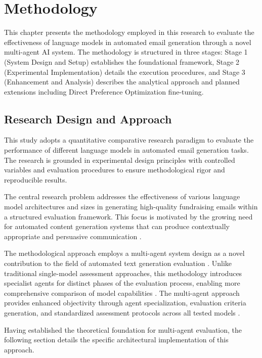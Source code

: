 \chapter{Methodology}

This chapter presents the methodology employed in this research to evaluate the effectiveness of language models in automated email generation through a novel multi-agent AI system. The methodology is structured in three stages: Stage 1 (System Design and Setup) establishes the foundational framework, Stage 2 (Experimental Implementation) details the execution procedures, and Stage 3 (Enhancement and Analysis) describes the analytical approach and planned extensions including Direct Preference Optimization fine-tuning.

\section{Research Design and Approach}
\label{sec:research-design}

This study adopts a quantitative comparative research paradigm to evaluate the performance of different language models in automated email generation tasks. The research is grounded in experimental design principles with controlled variables and evaluation procedures to ensure methodological rigor and reproducible results.

The central research problem addresses the effectiveness of various language model architectures and sizes in generating high-quality fundraising emails within a structured evaluation framework. This focus is motivated by the growing need for automated content generation systems that can produce contextually appropriate and persuasive communication \cite{murakami2023nlg_advertising, zheng2023click_controllable}.

The methodological approach employs a multi-agent system design as a novel contribution to the field of automated text generation evaluation \cite{guo2024llm_multiagent, yan2025beyond_selftalk}. Unlike traditional single-model assessment approaches, this methodology introduces specialist agents for distinct phases of the evaluation process, enabling more comprehensive comparison of model capabilities \cite{yehudai2025survey_llm_agents}. The multi-agent approach provides enhanced objectivity through agent specialization, evaluation criteria generation, and standardized assessment protocols across all tested models \cite{ma2024agentboard}.

Having established the theoretical foundation for multi-agent evaluation, the following section details the specific architectural implementation of this approach.

